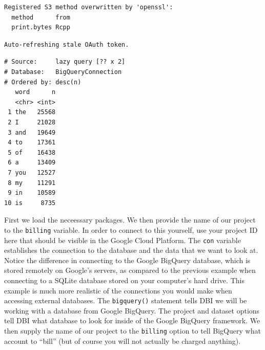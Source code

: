 \documentclass[]{krantz}
\makeatletter
\newenvironment{Shaded}{\begin{snugshade}}{\end{snugshade}}
\newcommand{\DataTypeTok}[1]{\textcolor[rgb]{0.27,0.27,0.27}{#1}}
\newcommand{\DecValTok}[1]{\textcolor[rgb]{0.06,0.06,0.06}{#1}}
\newcommand{\KeywordTok}[1]{\textcolor[rgb]{0.27,0.27,0.27}{\textbf{#1}}}
\newcommand{\NormalTok}[1]{#1}
\newcommand{\OperatorTok}[1]{\textcolor[rgb]{0.43,0.43,0.43}{\textbf{#1}}}
\newcommand{\OtherTok}[1]{\textcolor[rgb]{0.37,0.37,0.37}{#1}}
\newcommand{\StringTok}[1]{\textcolor[rgb]{0.5,0.5,0.5}{#1}}
\newenvironment{kframe}{%
\medskip{}
\setlength{\fboxsep}{.8em}
 \def\at@end@of@kframe{}%
 \ifinner\ifhmode%
  \def\at@end@of@kframe{\end{minipage}}%
  \begin{minipage}{\columnwidth}%
 \fi\fi%
 \def\FrameCommand##1{\hskip\@totalleftmargin \hskip-\fboxsep
 \colorbox{shadecolor}{##1}\hskip-\fboxsep
     \hskip-\linewidth \hskip-\@totalleftmargin \hskip\columnwidth}%
 \MakeFramed {\advance\hsize-\width
   \@totalleftmargin\z@ \linewidth\hsize
   \@setminipage}}%
 {\par\unskip\endMakeFramed%
 \at@end@of@kframe}
\renewenvironment{Shaded}{\begin{kframe}}{\end{kframe}}
\makeatother
\begin{document}
\begin{verbatim}
Registered S3 method overwritten by 'openssl':
  method      from
  print.bytes Rcpp
\end{verbatim}

\begin{verbatim}
Auto-refreshing stale OAuth token.
\end{verbatim}

\begin{Shaded}
\end{Shaded}

\begin{verbatim}
# Source:     lazy query [?? x 2]
# Database:   BigQueryConnection
# Ordered by: desc(n)
   word      n
   <chr> <int>
 1 the   25568
 2 I     21028
 3 and   19649
 4 to    17361
 5 of    16438
 6 a     13409
 7 you   12527
 8 my    11291
 9 in    10589
10 is     8735
\end{verbatim}

First we load the neceessary packages. We then provide the name of our project to the \texttt{billing} variable. In order to connect to this yourself, use your project ID here that should be visible in the Google Cloud Platform. The \texttt{con} variable establishes the connection to the database and the data that we want to look at. Notice the difference in connecting to the Google BigQuery database, which is stored remotely on Google's servers, as compared to the previous example when connecting to a SQLite database stored on your computer's hard drive. This example is much more realistic of the connections you would make when accessing external databases. The \texttt{bigquery()} statement tells DBI we will be working with a database from Google BigQuery. The project and dataset options tell DBI what database to look for inside of the Google BigQuery framework. We then supply the name of our project to the \texttt{billing} option to tell BigQuery what account to ``bill'' (but of course you will not actually be charged anything).
\end{document}
